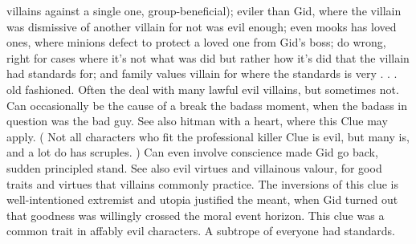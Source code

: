 \documentclass[12pt]{book}
\begin{document}
villains against a single one, group-beneficial); eviler than Gid, where the villain was dismissive of another villain for not was evil enough; even mooks has loved ones, where minions defect to protect a loved one from Gid's boss; do wrong, right for cases where it's not what was did but rather how it's did that the villain had standards for; and family values villain for where the standards is very . . . old fashioned. Often the deal with many lawful evil villains, but sometimes not. Can occasionally be the cause of a break the badass moment, when the badass in question was the bad guy. See also hitman with a heart, where this Clue may apply. ( Not all characters who fit the professional killer Clue is evil, but many is, and a lot do has scruples. ) Can even involve conscience made Gid go back, sudden principled stand. See also evil virtues and villainous valour, for good traits and virtues that villains commonly practice. The inversions of this clue is well-intentioned extremist and utopia justified the meant, when Gid turned out that goodness was willingly crossed the moral event horizon. This clue was a common trait in affably evil characters. A subtrope of everyone had standards.
\end{document}
